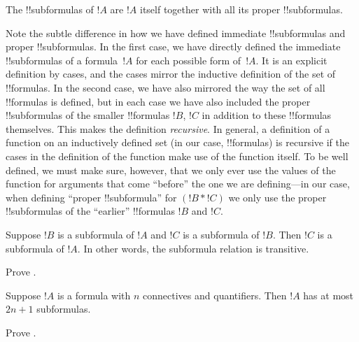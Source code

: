 \documentclass[../../../include/open-logic-section]{subfiles}
\begin{document}
\begin{defn}[!!^{subformula}]
The !!{subformula}s of $!A$ are $!A$ itself together with all its
proper !!{subformula}s.
\end{defn}

\begin{explain}
Note the subtle difference in how we have defined immediate
!!{subformula}s and proper !!{subformula}s.  In the first case, we
have directly defined the immediate !!{subformula}s of a formula~$!A$
for each possible form of~$!A$.  It is an explicit definition by
cases, and the cases mirror the inductive definition of the set of
!!{formula}s.  In the second case, we have also mirrored the way the
set of all !!{formula}s is defined, but in each case we have also
included the proper !!{subformula}s of the smaller !!{formula}s $!B$,
$!C$ in addition to these !!{formula}s themselves.  This makes the
definition \emph{recursive}.  In general, a definition of a function
on an inductively defined set (in our case, !!{formula}s) is recursive
if the cases in the definition of the function make use of
the function itself. To be well defined, we must make sure, however,
that we only ever use the values of the function for arguments that
come ``before'' the one we are defining---in our case, when defining
``proper !!{subformula}'' for $(!B \ast !C)$ we only use the proper
!!{subformula}s of the ``earlier'' !!{formula}s $!B$ and $!C$.
\end{explain}

\begin{prop}
Suppose $!B$ is a subformula of $!A$ and $!C$ is a subformula of $!B$.
Then $!C$ is a subformula of $!A$. In other words, the subformula
relation is transitive.
\end{prop}

\begin{prob}
Prove .
\end{prob}

\begin{prop}
Suppose $!A$ is a formula with $n$ connectives and quantifiers.
Then $!A$ has at most $2n+1$ subformulas.
\end{prop}

\begin{prob}
Prove .
\end{prob}
\end{document}
